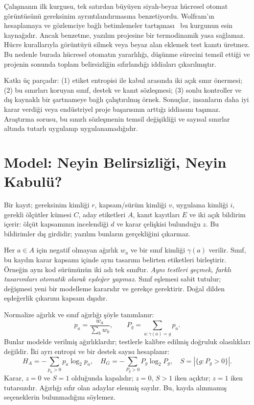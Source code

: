 \documentclass[runningheads]{llncs}
\begin{document}
Çalışmanın ilk kurgusu, tek satırdan büyüyen siyah-beyaz hücresel otomat görüntüsünü gereksinim ayrıntılandırmasına benzetiyordu. Wolfram'ın hesaplamaya ve gözlemciye bağlı betimlemeler tartışması~\cite{wolfram} bu kurgunun esin kaynağıdır. Ancak benzetme, yazılım projesine bir termodinamik yasa sağlamaz. Hücre kurallarıyla görüntüyü silmek veya beyaz alan eklemek test kanıtı üretmez. Bu nedenle burada hücresel otomatın yararlılığı, düşünme sürecini temsil ettiği ve projenin sonunda toplam belirsizliğin sıfırlandığı iddiaları çıkarılmıştır.

Katkı üç parçadır: (1) etiket entropisi ile kabul arasında iki açık sınır önermesi; (2) bu sınırları koruyan sınıf, destek ve kanıt sözleşmesi; (3) sonlu kontroller ve dış kaynaklı bir şartnameye bağlı çalıştırılmış örnek. Sonuçlar, insanların daha iyi karar verdiği veya endüstriyel proje başarısının arttığı iddiasını taşımaz. Araştırma sorusu, bu sınırlı sözleşmenin temsil değişikliği ve sayısal sınırlar altında tutarlı uygulanıp uygulanamadığıdır.

\section{Model: Neyin Belirsizliği, Neyin Kabulü?}
Bir kayıt; gereksinim kimliği $r$, kapsam/sürüm kimliği $v$, uygulama kimliği $i$, gerekli ölçütler kümesi $C$, aday etiketleri $A$, kanıt kayıtları $E$ ve iki açık bildirim içerir: ölçüt kapsamının incelendiği $d$ ve karar çelişkisi bulunduğu $z$. Bu bildirimler dış girdidir; yazılım bunların gerçekliğini çıkarmaz.

Her $a\in A$ için negatif olmayan ağırlık $w_a$ ve bir sınıf kimliği $\gamma(a)$ verilir. Sınıf, bu kaydın karar kapsamı içinde aynı tasarımı belirten etiketleri birleştirir. Örneğin aynı kod sürümünün iki adı tek sınıftır. \emph{Aynı testleri geçmek, farklı tasarımları otomatik olarak eşdeğer yapmaz.} Sınıf eşlemesi sabit tutulur; değişmesi yeni bir modelleme kararıdır ve gerekçe gerektirir. Doğal dilden eşdeğerlik çıkarımı kapsam dışıdır.

Normalize ağırlık ve sınıf ağırlığı şöyle tanımlanır:
\begin{equation}
p_a=\frac{w_a}{\sum_b w_b},\qquad P_g=\sum_{a:\gamma(a)=g}p_a.
\end{equation}
Bunlar modelde verilmiş ağırlıklardır; testlerle kalibre edilmiş doğruluk olasılıkları değildir. İki ayrı entropi ve bir destek sayısı hesaplanır:
\begin{equation}
H_A=-\sum_{p_a>0}p_a\log_2p_a,\quad
H_G=-\sum_{P_g>0}P_g\log_2P_g,\quad
S=|\{g:P_g>0\}|.
\end{equation}
Karar, $z=0$ ve $S=1$ olduğunda kapalıdır; $z=0$, $S>1$ iken açıktır; $z=1$ iken tutarsızdır. Ağırlığı sıfır olan adaylar elenmiş sayılır. Bu, kayda alınmamış seçeneklerin bulunmadığını söylemez.
\end{document}
